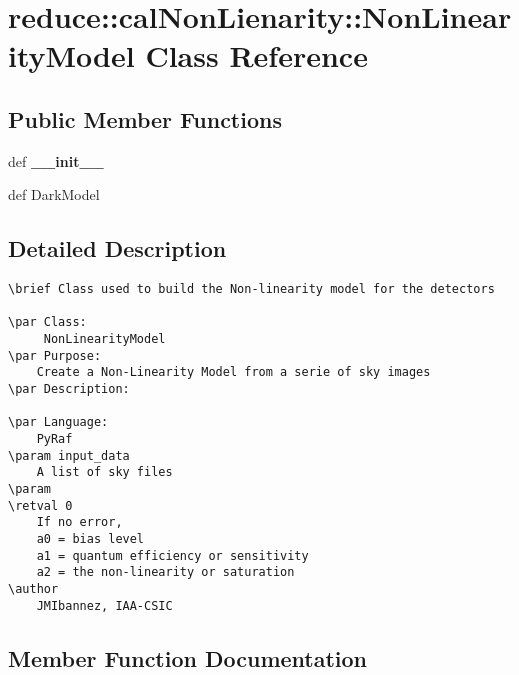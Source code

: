 \section{reduce::cal\-Non\-Lienarity::Non\-Linearity\-Model Class Reference}
\label{classreduce_1_1calNonLienarity_1_1NonLinearityModel}
\subsection*{Public Member Functions}
\begin{CompactItemize}
\item 
def \textbf{\_\-\_\-init\_\-\_\-}\label{classreduce_1_1calNonLienarity_1_1NonLinearityModel_f9caffb3776bff2f8dc76465e7677b10}

\item 
def {\bfcreate\-Dark\-Model}
\end{CompactItemize}


\subsection{Detailed Description}


\footnotesize\begin{verbatim}
\brief Class used to build the Non-linearity model for the detectors

\par Class:
     NonLinearityModel   
\par Purpose:
    Create a Non-Linearity Model from a serie of sky images
\par Description:

\par Language:
    PyRaf
\param input_data
    A list of sky files
\param
\retval 0
    If no error, 
    a0 = bias level
    a1 = quantum efficiency or sensitivity
    a2 = the non-linearity or saturation
\author
    JMIbannez, IAA-CSIC
\end{verbatim}
\normalsize
 



\subsection{Member Function Documentation}
